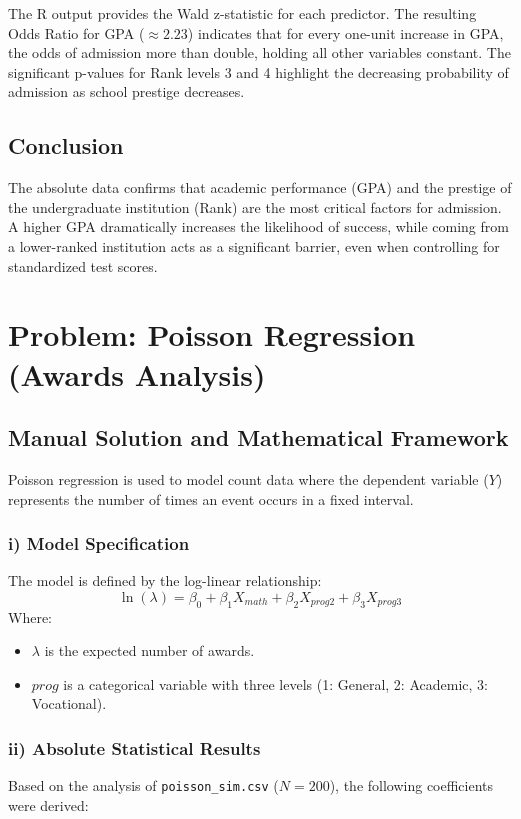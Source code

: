 \documentclass[12pt]{article}
\begin{document}
The R output provides the Wald z-statistic for each predictor. The resulting Odds Ratio for GPA ($\approx 2.23$) indicates that for every one-unit increase in GPA, the odds of admission more than double, holding all other variables constant. The significant p-values for Rank levels 3 and 4 highlight the decreasing probability of admission as school prestige decreases.

\subsection{Conclusion }
The absolute data confirms that academic performance (GPA) and the prestige of the undergraduate institution (Rank) are the most critical factors for admission. A higher GPA dramatically increases the likelihood of success, while coming from a lower-ranked institution acts as a significant barrier, even when controlling for standardized test scores.


\section{Problem: Poisson Regression (Awards Analysis)}
\label{prob_poisson}

\subsection{Manual Solution and Mathematical Framework}
Poisson regression is used to model count data where the dependent variable ($Y$) represents the number of times an event occurs in a fixed interval.

\subsubsection{i) Model Specification}
The model is defined by the log-linear relationship:
\[ \ln(\lambda) = \beta_0 + \beta_1 X_{math} + \beta_2 X_{prog2} + \beta_3 X_{prog3} \]
Where:
\begin{itemize}
    \item $\lambda$ is the expected number of awards.
    \item $prog$ is a categorical variable with three levels (1: General, 2: Academic, 3: Vocational).
\end{itemize}

\subsubsection{ii) Absolute Statistical Results}
Based on the analysis of \texttt{poisson\_sim.csv} ($N=200$), the following coefficients were derived:
\end{document}
